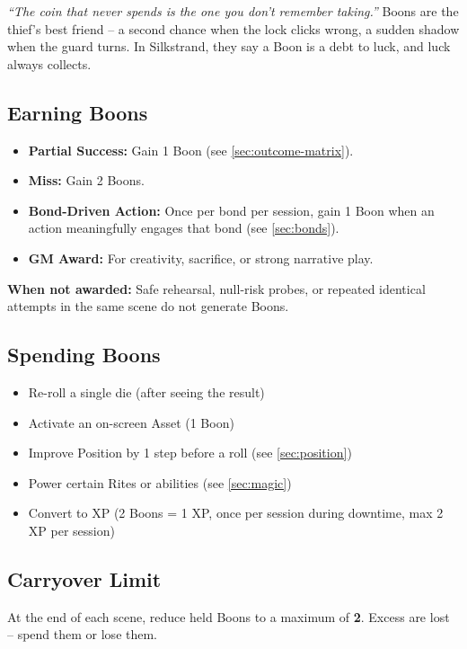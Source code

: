 \begin{tcolorbox}[colback=yellow!5!white,colframe=yellow!70!black,title=Lore of the Velvet Touch]
\emph{“The coin that never spends is the one you don’t remember taking.”}  
Boons are the thief’s best friend – a second chance when the lock clicks wrong, a sudden shadow when the guard turns. In Silkstrand, they say a Boon is a debt to luck, and luck always collects.
\end{tcolorbox}

\subsection{Earning Boons}
\label{sec:earning-boons}

\begin{itemize}
  \item \textbf{Partial Success:} Gain 1 Boon (see \ref{sec:outcome-matrix}).
  \item \textbf{Miss:} Gain 2 Boons.
  \item \textbf{Bond-Driven Action:} Once per bond per session, gain 1 Boon when an action meaningfully engages that bond (see \ref{sec:bonds}).
  \item \textbf{GM Award:} For creativity, sacrifice, or strong narrative play.
\end{itemize}

\noindent \textbf{When not awarded:} Safe rehearsal, null-risk probes, or repeated identical attempts in the same scene do not generate Boons.

\subsection{Spending Boons}
\label{sec:spending-boons}

\begin{itemize}
  \item Re-roll a single die (after seeing the result)
  \item Activate an on-screen Asset (1 Boon)
  \item Improve Position by 1 step before a roll (see \ref{sec:position})
  \item Power certain Rites or abilities (see \ref{sec:magic})
  \item Convert to XP (2 Boons = 1 XP, once per session during downtime, max 2 XP per session)
\end{itemize}

\subsection{Carryover Limit}
\label{sec:boon-carryover}
At the end of each scene, reduce held Boons to a maximum of \textbf{2}. Excess are lost – spend them or lose them.

